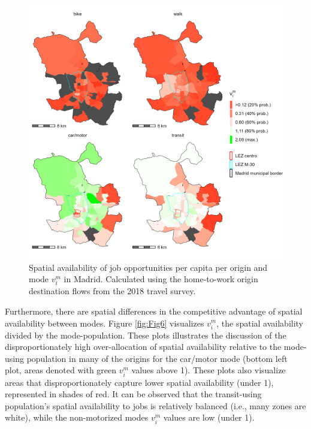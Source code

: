 \documentclass[]{trbunofficial}
\begin{document}
\begin{figure}

{\centering \includegraphics[width=1\linewidth]{images/SA_im_vv_zn208_plot} 

}

\caption{\label{fig:Fig6} Spatial availability of job opportunities per capita per origin and mode $v_i^m$ in Madrid. Calculated using the home-to-work origin destination flows from the 2018 travel survey.}\label{fig:SA-per-capita-m-plot}
\end{figure}

Furthermore, there are spatial differences in the competitive advantage
of spatial availability between modes. Figure \ref{fig:Fig6} visualizes
\(v_i^m\), the spatial availability divided by the mode-population.
These plots illustrates the discussion of the disproportionately high
over-allocation of spatial availability relative to the mode-using
population in many of the origins for the car/motor mode (bottom left
plot, areas denoted with green \(v_i^m\) values above 1). These plots
also visualize areas that disproportionately capture lower spatial
availability (under 1), represented in shades of red. It can be observed
that the transit-using population's spatial availability to jobs is
relatively balanced (i.e., many zones are white), while the
non-motorized modes \(v_i^m\) values are low (under 1).
\end{document}
